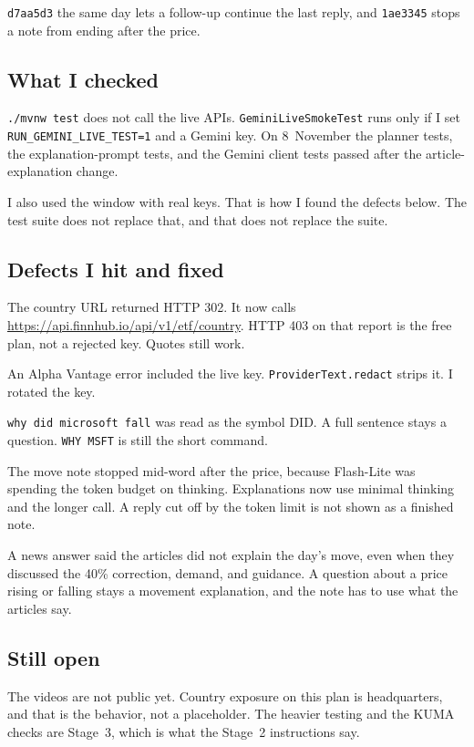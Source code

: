 \documentclass[11pt]{article}
\begin{document}
\texttt{d7aa5d3} the same day lets a follow-up continue the last reply, and \texttt{1ae3345} stops a note from ending after the price.

\subsection{What I checked}
\texttt{./mvnw test} does not call the live APIs. \texttt{GeminiLiveSmokeTest} runs only if I set \texttt{RUN\_GEMINI\_LIVE\_TEST=1} and a Gemini key. On 8~November the planner tests, the explanation-prompt tests, and the Gemini client tests passed after the article-explanation change.

I also used the window with real keys. That is how I found the defects below. The test suite does not replace that, and that does not replace the suite.

\subsection{Defects I hit and fixed}
The country URL returned HTTP 302. It now calls \url{https://api.finnhub.io/api/v1/etf/country}. HTTP 403 on that report is the free plan, not a rejected key. Quotes still work.

An Alpha Vantage error included the live key. \texttt{ProviderText.redact} strips it. I rotated the key.

\texttt{why did microsoft fall} was read as the symbol DID. A full sentence stays a question. \texttt{WHY MSFT} is still the short command.

The move note stopped mid-word after the price, because Flash-Lite was spending the token budget on thinking. Explanations now use minimal thinking and the longer call. A reply cut off by the token limit is not shown as a finished note.

A news answer said the articles did not explain the day's move, even when they discussed the 40\% correction, demand, and guidance. A question about a price rising or falling stays a movement explanation, and the note has to use what the articles say.

\subsection{Still open}
The videos are not public yet. Country exposure on this plan is headquarters, and that is the behavior, not a placeholder. The heavier testing and the KUMA checks are Stage~3, which is what the Stage~2 instructions say.
\end{document}
